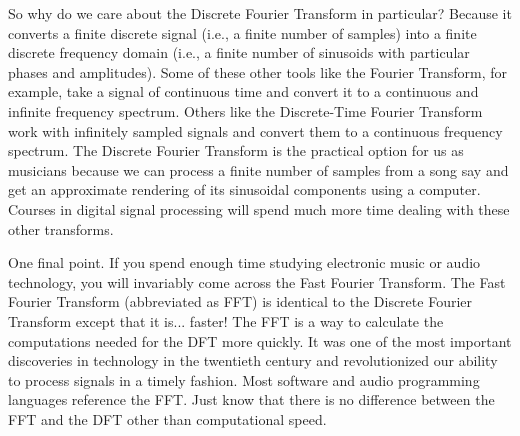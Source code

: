 So why do we care about the Discrete Fourier Transform in particular?  Because it converts a finite discrete
signal (i.e., a finite number of samples) into a finite discrete frequency domain (i.e., a finite number of sinusoids 
with particular phases and amplitudes).  Some of these other tools like the Fourier Transform, for example, take a 
signal of continuous time and convert it to a continuous and infinite frequency spectrum.  Others like the
Discrete-Time Fourier Transform work with infinitely sampled signals and convert them to a continuous frequency
spectrum.  The Discrete Fourier Transform is the practical option for us as musicians because we can process a finite
number of samples from a song say and get an approximate rendering of its sinusoidal components using
a computer.  Courses in
digital signal processing will spend much more time dealing with these other transforms.

One final point.  If you spend enough time studying electronic music or audio technology, you will invariably come
across the Fast Fourier Transform.  The Fast Fourier Transform (abbreviated as FFT) is identical to the Discrete Fourier Transform except
that it is... faster!   The FFT is a way to calculate the computations needed for
the DFT more quickly.  It was one of the most important discoveries in technology in the twentieth century and revolutionized
our ability to process signals in a timely fashion.  Most software and audio programming languages reference
the FFT.  Just know that there is no difference between the FFT and the DFT other than computational speed.

